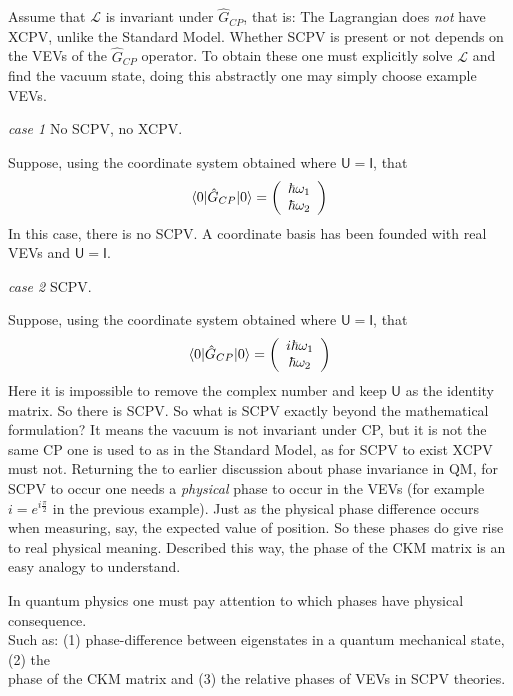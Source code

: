 Assume that $\mathcal{L}$ is invariant under $\hat{G}_{CP}$, that is: The Lagrangian does \textit{not} have XCPV, unlike the Standard Model. Whether SCPV is present or not depends on the VEVs of the $\hat{G}_{CP}$ operator. To obtain these one must explicitly solve $\mathcal{L}$ and find the vacuum state, doing this abstractly one may simply choose example VEVs.\\

\begin{flushleft}\textit{case 1} No SCPV, no XCPV. \end{flushleft} 
Suppose, using the coordinate system obtained where $\mathsf{U}=\mathsf{I}$, that
\begin{align*}
\braket{0|\hat{G}_{CP}|0} = \left( \begin{array}{c} \hbar \omega_1 \\ \hbar \omega_2 \end{array}\right)
\end{align*}
In this case, there is no SCPV. A coordinate basis has been founded with real VEVs and $\mathsf{U} = \mathsf{I}$.

\begin{flushleft}\textit{case 2} SCPV. \end{flushleft} 
Suppose, using the coordinate system obtained where $\mathsf{U}=\mathsf{I}$, that
\begin{align*}
\braket{0|\hat{G}_{CP}|0} = \left( \begin{array}{c} i\hbar \omega_1 \\ \hbar \omega_2 \end{array}\right)
\end{align*}
Here it is impossible to remove the complex number and keep $\mathsf{U}$ as the identity matrix. So there is SCPV. So what is SCPV exactly beyond the mathematical formulation? It means the vacuum is not invariant under CP, but it is not the same CP one is used to as in the Standard Model, as for SCPV to exist XCPV must not. Returning the to earlier discussion about phase invariance in QM, for SCPV to occur one  needs a \textit{physical} phase to occur in the VEVs (for example $i=e^{i\frac{\pi}{2}}$ in the previous example). Just as the physical phase difference occurs when measuring, say, the expected value of position. So these phases do give rise to real physical meaning. Described this way, the phase of the CKM matrix is an easy analogy to understand.

\begin{center}
In quantum physics one must pay attention to which phases have physical consequence. \\Such as: (1) phase-difference between eigenstates in a quantum mechanical state, (2) the\\ phase of the CKM matrix and (3) the relative phases of VEVs in SCPV theories.
\end{center}


